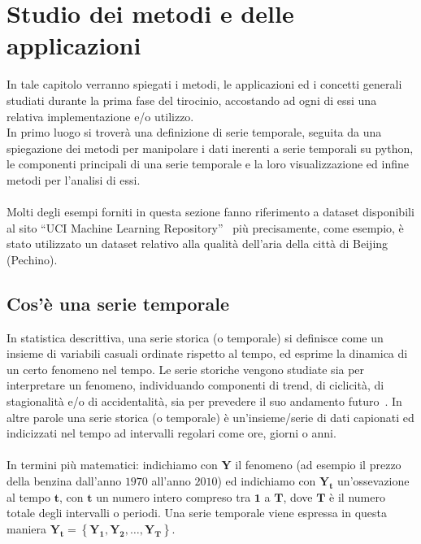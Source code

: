 \section{Studio dei metodi e delle applicazioni}
In tale capitolo verranno spiegati i metodi, le applicazioni ed i concetti 
generali studiati durante la prima fase del tirocinio, accostando ad ogni 
di essi una relativa implementazione e/o utilizzo.\\
In primo luogo si troverà una definizione di serie temporale, seguita da
una spiegazione dei metodi per manipolare i dati inerenti a serie temporali 
su python, le componenti principali di una serie temporale e la loro visualizzazione
ed infine metodi per l'analisi di essi.\\
\\
Molti degli esempi forniti in questa sezione fanno riferimento a dataset disponibili
al sito ``UCI Machine Learning Repository''~\cite{dua:2019} più precisamente, come
esempio, è stato utilizzato un dataset relativo alla qualità dell'aria della città di
Beijing~\cite{dua:air_quality} (Pechino).
 
\subsection{Cos'è una serie temporale}
In statistica descrittiva, una serie storica (o temporale) si definisce come un insieme di variabili 
casuali ordinate rispetto al tempo, ed esprime la dinamica di un certo 
fenomeno nel tempo. Le serie storiche vengono studiate sia per 
interpretare un fenomeno, individuando componenti di trend, di ciclicità, 
di stagionalità e/o di accidentalità, sia per prevedere il suo 
andamento futuro~\cite{wiki:serie_storica}.
In altre parole una serie storica (o temporale) è un'insieme/serie di dati
capionati ed indicizzati nel tempo ad intervalli regolari come ore, giorni 
o anni.\\
\\
In termini più matematici: indichiamo con $\bm{Y}$ il fenomeno (ad esempio 
il prezzo della benzina dall'anno $1970$ all'anno $2010$) ed indichiamo con
$\bm{Y_t}$ un'ossevazione al tempo $\bm{t}$, con $\bm{t}$ un numero intero
compreso tra $\bm{1}$ a $\bm{T}$, dove $\bm{T}$ è il numero totale degli intervalli o 
periodi. Una serie temporale viene espressa in questa maniera 
$\bm{Y_t} = \left\{  \bm{Y_1}, \bm{Y_2}, \dots , \bm{Y_T}  \right\}$.

